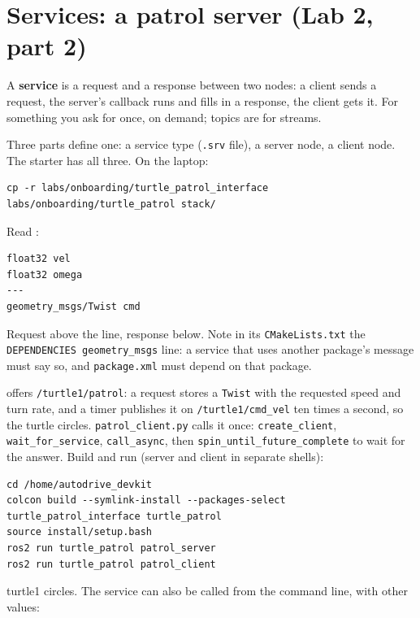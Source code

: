 \documentclass[11pt,a4paper]{article}
\begin{document}

\section{Services: a patrol server (Lab 2, part 2)}

A \textbf{service} is a request and a response between two nodes: a client sends a request, the
server's callback runs and fills in a response, the client gets it. For something you ask for
once, on demand; topics are for streams.

Three parts define one: a service type (\texttt{.srv} file), a server node, a client node. The
starter has all three. On the laptop:

\begin{lstlisting}
cp -r labs/onboarding/turtle_patrol_interface labs/onboarding/turtle_patrol stack/
\end{lstlisting}

Read :

\begin{lstlisting}
float32 vel
float32 omega
---
geometry_msgs/Twist cmd
\end{lstlisting}

Request above the line, response below. Note in its \texttt{CMakeLists.txt} the
\texttt{DEPENDENCIES geometry\_msgs} line: a service that uses another package's message must say
so, and \texttt{package.xml} must depend on that package.

 offers \texttt{/turtle1/patrol}:
a request stores a \texttt{Twist} with the requested speed and turn rate, and a timer publishes
it on \texttt{/turtle1/cmd\_vel} ten times a second, so the turtle circles.
\texttt{patrol\_client.py} calls it once: \texttt{create\_client}, \texttt{wait\_for\_service},
\texttt{call\_async}, then \texttt{spin\_until\_future\_complete} to wait for the answer. Build
and run (server and client in separate shells):

\begin{lstlisting}
cd /home/autodrive_devkit
colcon build --symlink-install --packages-select turtle_patrol_interface turtle_patrol
source install/setup.bash
ros2 run turtle_patrol patrol_server
ros2 run turtle_patrol patrol_client
\end{lstlisting}

turtle1 circles. The service can also be called from the command line, with other values:
\end{document}
